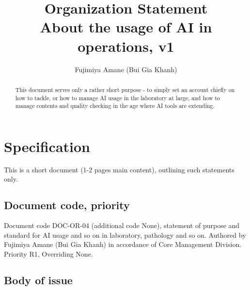 \documentclass[10pt,a4paper]{article}
\title{\textbf{Organization Statement} \\ About the usage of AI in operations, v1} %
\author{Fujimiya Amane (Bui Gia Khanh)} %
\affiliation{} %
\begin{document}
\maketitle

\begin{abstract}
    \noindent
    This document serves only a rather short purpose - to simply set an account chiefly on how to tackle, or how to manage AI usage in the laboratory at large, and how to manage contents and quality checking in the age where AI tools are extending. 

\end{abstract}

\vspace{2.5cm}



\thispagestyle{firstpage}

\pagebreak


\newgeometry{} %

\section{Specification}
\label{sec:spec}

This is a short document (1-2 pages main content), outlining such statements only. 

\subsection{Document code, priority}


Document code DOC-OR-04 (additional code None), statement of purpose and standard for AI usage and so on in laboratory, pathology and so on. Authored by Fujimiya Amane (Bui Gia Khanh) in accordance of Core Management Division. Priority R1, Overriding None. 

\subsection{Body of issue}
\end{document}
